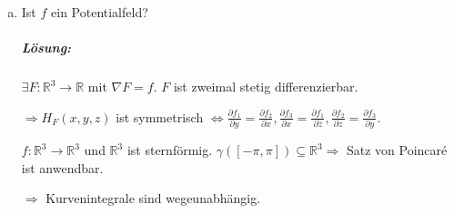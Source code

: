 \documentclass{scrreprt}
\begin{document}
\begin{enumerate}[a)]
\item Ist $f$ ein Potentialfeld?
  \subparagraph{Lösung:} $\exists F \colon \mathbb{R}^3 \to \mathbb{R}$
  mit $\nabla F = f$.
  $F$ ist zweimal stetig differenzierbar.

  $\Rightarrow H_F(x, y, z)$ ist symmetrisch
  $\iff \frac{\partial f_1}{\partial y} = \frac{\partial f_2}{\partial x},
  \frac{\partial f_3}{\partial x} = \frac{\partial f_1}{\partial z},
  \frac{\partial f_2}{\partial z} = \frac{\partial f_3}{\partial y}$.

  $f \colon \mathbb{R}^3 \to \mathbb{R}^3$ und $\mathbb{R}^3$ ist sternförmig.
  $\gamma([-\pi, \pi]) \subseteq \mathbb{R}^3 \Rightarrow$ Satz von Poincaré ist
  anwendbar.

  $\Rightarrow$ Kurvenintegrale sind wegeunabhängig.
\end{enumerate}
\end{document}
